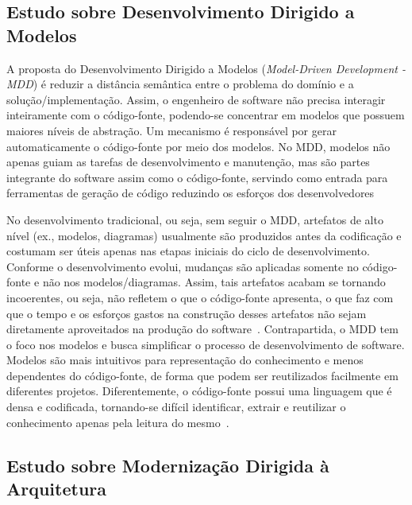 \subsection{Estudo sobre Desenvolvimento Dirigido a Modelos} %
\label{sub:desenvolvimento_dirigido_a_modelos}

A proposta do Desenvolvimento Dirigido a Modelos (\textit{Model-Driven Development - MDD}) é reduzir a distância semântica entre o problema do domínio e a solução/implementação. Assim, o engenheiro de software não precisa interagir inteiramente com o código-fonte, podendo-se concentrar em modelos que possuem maiores níveis de abstração. Um mecanismo é responsável por gerar automaticamente o código-fonte por meio dos modelos. No MDD, modelos não apenas guiam as tarefas de desenvolvimento e manutenção, mas são partes integrante do software assim como o código-fonte, servindo como entrada para ferramentas de geração de código reduzindo os esforços dos desenvolvedores~\cite{Bittar, Kleppe:2003}


No desenvolvimento tradicional, ou seja, sem seguir o MDD, artefatos de alto nível (ex., modelos, diagramas) usualmente são produzidos antes da codificação e costumam ser úteis apenas nas etapas iniciais do ciclo de desenvolvimento. Conforme o desenvolvimento evolui, mudanças são aplicadas somente no código-fonte e não nos modelos/diagramas. Assim, tais artefatos acabam se tornando incoerentes, ou seja, não refletem o que o código-fonte apresenta, o que faz com que o tempo e os esforços gastos na construção desses artefatos não sejam diretamente aproveitados na produção do software~\cite{Bittar}. Contrapartida, o MDD tem o foco nos modelos e busca simplificar o processo de desenvolvimento de software. Modelos são mais intuitivos para representação do conhecimento e menos dependentes do código-fonte, de forma que podem ser reutilizados facilmente em diferentes projetos. Diferentemente, o código-fonte possui uma linguagem que é densa e codificada, tornando-se difícil identificar, extrair e reutilizar o conhecimento apenas pela leitura do mesmo~\citep{Kleppe:2003}.




\subsection{Estudo sobre Modernização Dirigida à Arquitetura } %
\label{sub:estudo_sobre_moderniza_o_dirigida_arquitetura_}

